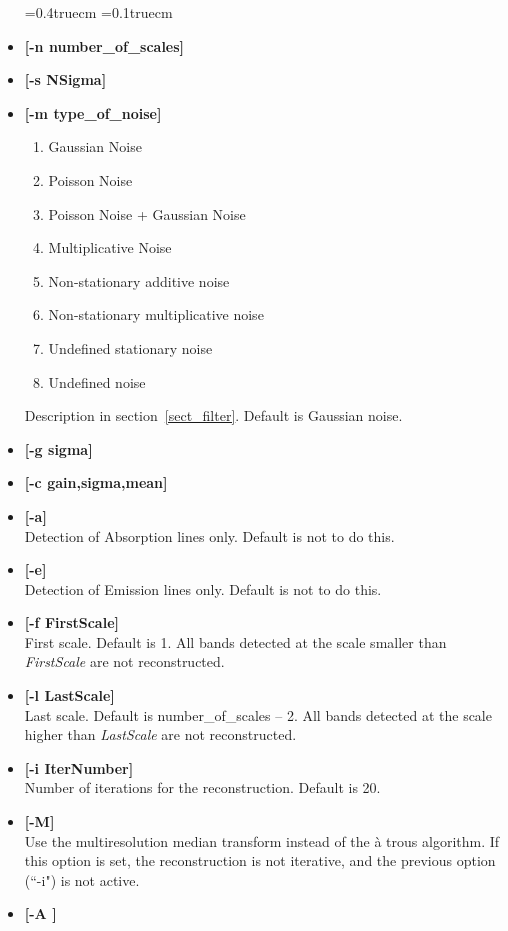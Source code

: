 \begin{itemize}
\baselineskip=0.4truecm
\itemsep=0.1truecm
\item {\bf [-n number\_of\_scales]} 
\item {\bf [-s NSigma]} 
\item {\bf [-m type\_of\_noise]}
{\small
\begin{enumerate}
\baselineskip=0.4truecm
\itemsep=0.1truecm
\item Gaussian Noise 
\item Poisson Noise 
\item Poisson Noise + Gaussian Noise 
\item Multiplicative Noise 
\item Non-stationary additive noise 
\item Non-stationary multiplicative noise 
\item Undefined stationary noise 
\item Undefined noise 
\end{enumerate}
}
Description in section~\ref{sect_filter}. Default is Gaussian noise.
\item {\bf [-g sigma]} 
\item {\bf [-c gain,sigma,mean]} 
\item {\bf [-a]} \\
Detection of Absorption lines only. Default is not to do this. 
\item {\bf [-e]} \\
Detection of Emission lines only. Default is not to do this. 
\item {\bf [-f FirstScale]} \\
First scale. Default is 1. All bands detected at the scale smaller than 
{\em FirstScale} are not reconstructed.
\item {\bf [-l LastScale]} \\
Last scale. Default is number\_of\_scales -- 2.
All bands detected at the scale higher than {\em LastScale} are not reconstructed.
\item {\bf [-i IterNumber]} \\
Number of iterations for the reconstruction. Default is 20.
 \item {\bf [-M]} \\
Use the multiresolution median transform 
instead of the \`a trous algorithm. If this option is set, the reconstruction
is not iterative, and the previous option (``-i") is not active.
\item {\bf [-A ]} \\

\end{itemize}
